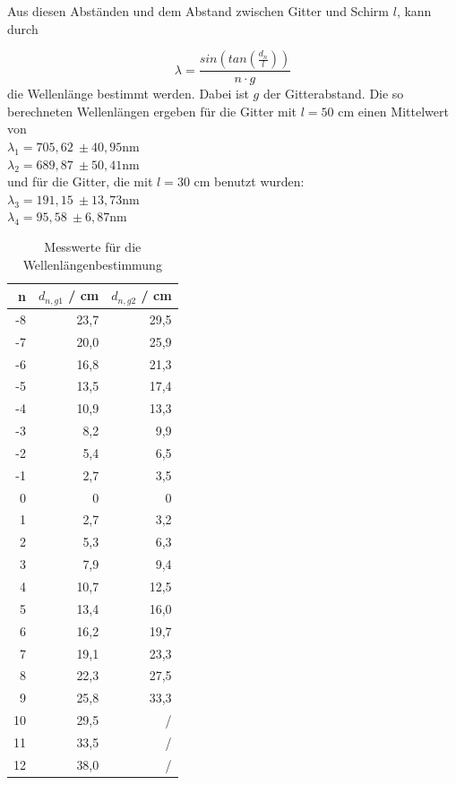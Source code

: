 Aus diesen Abständen und dem Abstand zwischen Gitter und Schirm $l$, kann durch

\begin{equation}
  \lambda = \frac{sin \left(tan \left(\frac{d_n}{l}\right)\right)}{n \cdot g}
\end{equation}
die Wellenlänge bestimmt werden. Dabei ist $g$ der Gitterabstand. 
Die so berechneten Wellenlängen ergeben für die Gitter mit $l = 50$ cm einen Mittelwert von \\
$\lambda_1 = 705,62 \: \pm 40,95 \si{\nano\meter}$ \\
$\lambda_2 = 689,87 \: \pm 50,41 \si{\nano\meter}$ \\
und für die Gitter, die mit $l = 30$ cm benutzt wurden: \\
$\lambda_3 = 191,15 \: \pm 13,73 \si{\nano\meter}$ \\
$\lambda_4 = 95,58 \: \pm 6,87 \si{\nano\meter}$ \\



\begin{table}[H]
  \centering
  \footnotesize
  \caption{Messwerte für die Wellenlängenbestimmung}
  \label{tab:wel}
  \begin{tabular}{r r r}
  \toprule
    n & $d_{n,g1}$ / cm & $d_{n,g2}$ / cm \\
  \midrule
    -8 & 23,7 & 29,5 \\
    -7 & 20,0 & 25,9 \\
    -6 & 16,8 & 21,3 \\
    -5 & 13,5 & 17,4 \\
    -4 & 10,9 & 13,3 \\
    -3 & 8,2  & 9,9 \\
    -2 & 5,4  & 6,5 \\
    -1 & 2,7  & 3,5 \\
    0  & 0    & 0   \\
    1  & 2,7  & 3,2 \\
    2  & 5,3  & 6,3 \\
    3  & 7,9  & 9,4 \\
    4  & 10,7 & 12,5 \\
    5  & 13,4 & 16,0 \\
    6  & 16,2 & 19,7 \\
    7  & 19,1 & 23,3 \\ 
    8  & 22,3 & 27,5 \\
    9  & 25,8 & 33,3 \\
    10 & 29,5 & /    \\
    11 & 33,5 & /    \\
    12 & 38,0 & /    \\
  \bottomrule
  \end{tabular}
\end{table}
